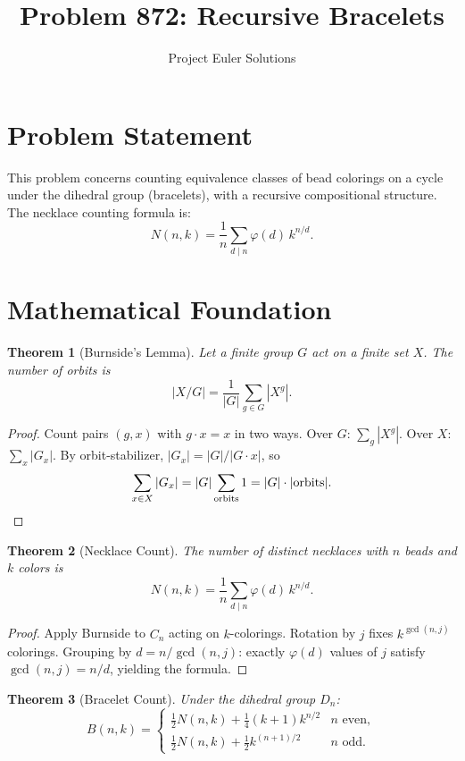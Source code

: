 \documentclass[11pt]{article}
\title{Problem 872: Recursive Bracelets}
\author{Project Euler Solutions}
\date{}
\newtheorem{theorem}{Theorem}
\begin{document}
\maketitle

\section{Problem Statement}

This problem concerns counting equivalence classes of bead colorings on a cycle under the dihedral group (bracelets), with a recursive compositional structure. The necklace counting formula is:
\[
N(n,k) = \frac{1}{n}\sum_{d \mid n}\varphi(d)\,k^{n/d}.
\]

\section{Mathematical Foundation}

\begin{theorem}[Burnside's Lemma]
Let a finite group $G$ act on a finite set $X$. The number of orbits is
\[
|X/G| = \frac{1}{|G|}\sum_{g \in G} |X^g|.
\]
\end{theorem}

\begin{proof}
Count pairs $(g,x)$ with $g \cdot x = x$ in two ways. Over $G$: $\sum_{g}|X^g|$. Over $X$: $\sum_{x}|G_x|$. By orbit-stabilizer, $|G_x| = |G|/|G \cdot x|$, so
\[
\sum_{x \in X} |G_x| = |G| \sum_{\text{orbits}} 1 = |G| \cdot |\text{orbits}|. \qedhere
\]
\end{proof}

\begin{theorem}[Necklace Count]
The number of distinct necklaces with $n$ beads and $k$ colors is
\[
N(n,k) = \frac{1}{n}\sum_{d \mid n}\varphi(d)\,k^{n/d}.
\]
\end{theorem}

\begin{proof}
Apply Burnside to $C_n$ acting on $k$-colorings. Rotation by $j$ fixes $k^{\gcd(n,j)}$ colorings. Grouping by $d = n/\gcd(n,j)$: exactly $\varphi(d)$ values of $j$ satisfy $\gcd(n,j)=n/d$, yielding the formula.
\end{proof}

\begin{theorem}[Bracelet Count]
Under the dihedral group $D_n$:
\[
B(n,k) = \begin{cases}
\frac{1}{2}N(n,k) + \frac{1}{4}(k+1)k^{n/2} & n \text{ even},\\[4pt]
\frac{1}{2}N(n,k) + \frac{1}{2}k^{(n+1)/2} & n \text{ odd}.
\end{cases}
\]
\end{theorem}
\end{document}
